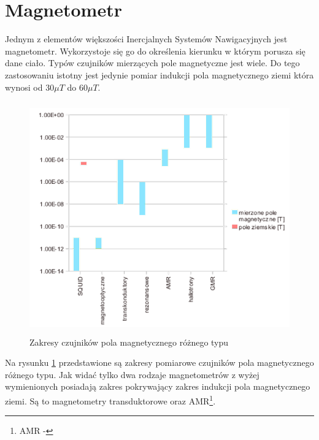 \section{Magnetometr}
Jednym z elementów większości Inercjalnych Systemów Nawigacyjnych jest
magnetometr. Wykorzystoje się go do określenia kierunku w którym porusza się dane
ciało. Typów czujników mierzących pole magnetyczne jest wiele. Do tego
zastosowaniu istotny jest jedynie pomiar indukcji pola magnetycznego ziemi która
wynosi od $30\mu T$ do $60\mu T$.
\\

\begin{figure}[!ht]
 \centering
 \includegraphics[height=100mm]{../images/ch04/magnetic_sens_types.png}
 \caption{Zakresy czujników pola magnetycznego różnego typu \cite{WstepnyProjektModuluIMU}}
 \label{fig:WykresMagnet}
\end{figure}

Na rysunku \ref{fig:WykresMagnet} przedstawione są zakresy pomiarowe czujników
pola magnetycznego różnego typu. Jak widać tylko dwa rodzaje magnetometrów z
wyżej wymienionych posiadają zakres pokrywający zakres indukcji pola
magnetycznego ziemi. Są to magnetometry transduktorowe oraz AMR\footnote{AMR - }.
